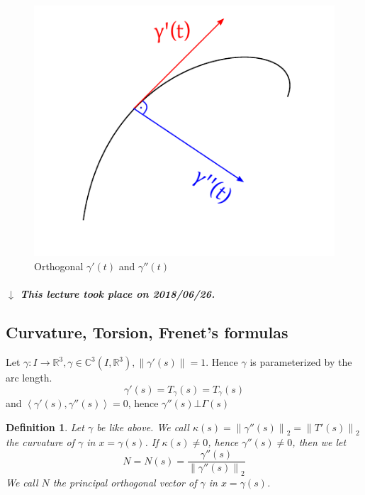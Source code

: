 \documentclass{article}
\newtheorem{definition}{Definition}  \numberwithin{definition}{section}
\newcommand{\angel}[1]{\left\langle#1\right\rangle}
\newcommand{\norm}[1]{\left\|#1\right\|}
\newcommand{\dateref}[1]{%
  \begin{mdframed}[backgroundcolor=gray!10,innerbottommargin=0pt,innertopmargin=0pt]
    \paragraph{\textit{$\downarrow$ This lecture took place on #1.}}%
  \end{mdframed}%
}
\begin{document}
\begin{figure}[t]
  \begin{center}
    \includegraphics{img/49_orthogonal.pdf}
    \caption{Orthogonal $\gamma'(t)$ and $\gamma''(t)$}
    \label{img:orthott}
  \end{center}
\end{figure}

\dateref{2018/06/26}

\subsection{Curvature, Torsion, Frenet's formulas}

Let $\gamma: I \to \mathbb R^3, \gamma \in \mathbb C^3(I, \mathbb R^3), \norm{\gamma'(s)} = 1$.
Hence $\gamma$ is parameterized by the arc length.
\[ \gamma'(s) = T_\gamma(s) = T_\gamma(s) \]
and $\angel{\gamma'(s), \gamma''(s)} = 0$, hence $\gamma''(s) \bot \Gamma(s)$

\begin{definition} %
  Let $\gamma$ be like above. We call $\kappa(s) = \norm{\gamma''(s)}_2 = \norm{T'(s)}_2$ \emph{the curvature of $\gamma$ in $x = \gamma(s)$}.
  If $\kappa(s) \neq 0$, hence $\gamma''(s) \neq 0$, then we let
  \[ N = N(s) = \frac{\gamma''(s)}{\norm{\gamma''(s)}_2} \]
  We call $N$ the \emph{principal orthogonal vector of $\gamma$ in $x = \gamma(s)$}.
\end{definition}
\end{document}
